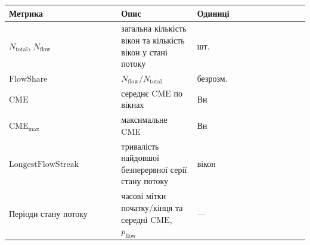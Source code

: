\documentclass[12pt,a4paper]{article}
\begin{document}
{\def\LTcaptype{none} %

\begin{longtable}[]{@{}

  >{\raggedright\arraybackslash}p{0.3750\linewidth}

  >{\raggedright\arraybackslash}p{0.2500\linewidth}

  >{\raggedright\arraybackslash}p{0.3750\linewidth}@{}}

\toprule\noalign{}

\begin{minipage}[b]{\linewidth}\raggedright

Метрика

\end{minipage} & \begin{minipage}[b]{\linewidth}\raggedright

Опис

\end{minipage} & \begin{minipage}[b]{\linewidth}\raggedright

Одиниці

\end{minipage} \\

\midrule\noalign{}

\endhead

\bottomrule\noalign{}

\endlastfoot

\(N_{\text{total}}\), \(N_{\text{flow}}\) & загальна кількість вікон та кількість вікон у стані потоку & шт. \\

\(\text{FlowShare}\) & \(N_{\text{flow}} / N_{\text{total}}\) & безрозм. \\

\(\overline{\text{CME}}\) & середнє CME по вікнах & Вн \\

\(\text{CME}_{\max}\) & максимальне CME & Вн \\

\(\text{LongestFlowStreak}\) & тривалість найдовшої безперервної серії стану потоку & вікон \\

Періоди стану потоку & часові мітки початку/кінця та середні \(\text{CME}\), \(p_{\text{flow}}\) & --- \\

\end{longtable}

}
\end{document}

